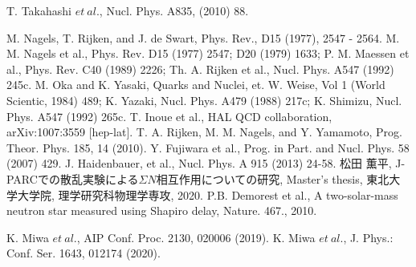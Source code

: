 \begin{thebibliography}{99}
%



T. Takahashi $et\ al.$, Nucl. Phys. A835, (2010) 88.
%






M. Nagels, T. Rijken, and J. de Swart, Phys. Rev., D15 (1977), 2547 - 2564.
M. M. Nagels et al., Phys. Rev. D15 (1977) 2547; D20 (1979) 1633; P. M. Maessen et al., Phys. Rev. C40 (1989) 2226; Th. A. Rijken et al., Nucl. Phys. A547 (1992) 245c.
M. Oka and K. Yasaki, Quarks and Nuclei, et. W. Weise, Vol 1 (World Scientic, 1984) 489; K. Yazaki, Nucl. Phys. A479 (1988) 217c; K. Shimizu, Nucl. Phys. A547 (1992) 265c.
T. Inoue et al., HAL QCD collaboration, arXiv:1007:3559 [hep-lat].
T. A. Rijken, M. M. Nagels, and Y. Yamamoto, Prog. Theor. Phys. 185, 14 (2010).
Y. Fujiwara et al., Prog. in Part. and Nucl. Phys. 58 (2007) 429.
J. Haidenbauer, et al., Nucl. Phys. A 915 (2013) 24-58.
松田 薫平, J-PARCでの散乱実験による$\Sigma N$相互作用についての研究, Master's thesis, 東北大学大学院, 理学研究科物理学専攻, 2020.
P.B. Demorest et al., A two-solar-mass neutron star measured using Shapiro delay, Nature. 467., 2010.


K. Miwa $et\ al.$, AIP Conf. Proc. 2130, 020006 (2019).
K. Miwa $et\ al.$, J. Phys.: Conf. Ser. 1643, 012174 (2020).






\end{thebibliography}
